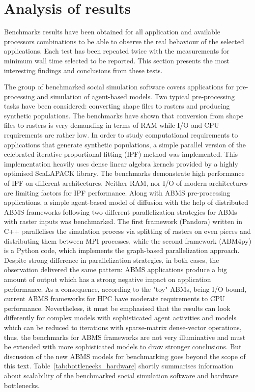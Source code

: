 \section{Analysis of results}
Benchmarks results have been obtained for all application and available processors combinations to be able to observe the real behaviour of the selected applications.
Each test has been repeated twice with the measurements for minimum wall time selected to be reported. This section presents the most interesting findings and conclusions from these tests.%

The group of benchmarked social simulation software covers applications for pre-processing and simulation of agent-based models. Two typical pre-processing tasks have been considered: converting shape files to rasters and producing synthetic populations. The benchmarks have shown that conversion from shape files to rasters is very demanding in terms of RAM while I/O and CPU requirements are rather low. In order to study computational requirements to applications that generate synthetic populations, a simple parallel version of the celebrated iterative proportional fitting (IPF) method was implemented. This implementation heavily uses dense linear algebra kernels provided by a highly optimised ScaLAPACK library. The benchmarks demonstrate high performance of IPF on different architectures. Neither RAM, nor I/O of modern architectures are limiting factors for IPF performance. Along with ABMS pre-processing applications, a simple agent-based model of diffusion with the help of distributed ABMS frameworks following two different parallelization strategies for ABMs with raster inputs was benchmarked. The first framework (Pandora) written in C++ parallelises the simulation process via splitting of rasters on even pieces and distributing them between MPI processes, while the second framework (ABM4py) is a Python code, which implements the graph-based parallelization approach. Despite strong difference in parallelization strategies, in both cases, the observation delivered the same pattern: ABMS applications produce a big amount of output which has a strong negative impact on application performance. As a consequence, according to the "toy" ABMs, being I/O bound, current ABMS frameworks for HPC have moderate requirements to CPU performance. Nevertheless, it must be emphasised that the results can look differently for complex models with sophisticated agent activities and models which can be reduced to iterations with sparse-matrix dense-vector operations, thus, the benchmarks for ABMS frameworks are not very illuminative and must be extended with more sophisticated models to draw stronger conclusions. But discussion of the new ABMS models for benchmarking goes beyond the scope of this text. Table~\ref{tab:bottlenecks_hardware} shortly summarises information about scalability of the benchmarked social simulation software and hardware bottlenecks.


